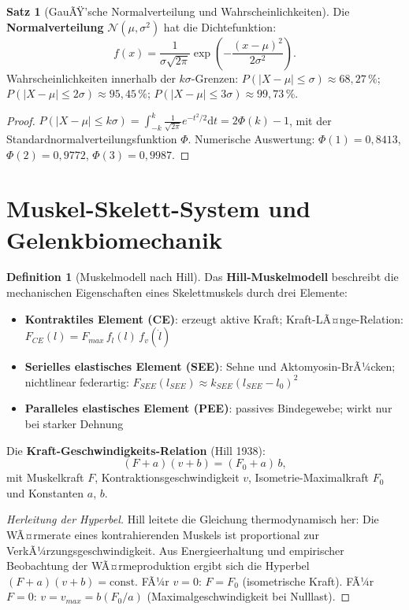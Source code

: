 ﻿\documentclass[a4paper,12pt]{report}
\theoremstyle{definition}
\newtheorem{definition}{Definition}
\newtheorem{satz}{Satz}
\begin{document}
\begin{satz}[GauÃŸ'sche Normalverteilung und Wahrscheinlichkeiten]
Die \textbf{Normalverteilung} $\mathcal{N}(\mu, \sigma^2)$ hat die Dichtefunktion:
\[
  f(x) = \frac{1}{\sigma\sqrt{2\pi}}\exp\left(-\frac{(x-\mu)^2}{2\sigma^2}\right).
\]
Wahrscheinlichkeiten innerhalb der $k\sigma$-Grenzen:
$P(|X-\mu| \le \sigma) \approx 68{,}27\,\%$;
$P(|X-\mu| \le 2\sigma) \approx 95{,}45\,\%$;
$P(|X-\mu| \le 3\sigma) \approx 99{,}73\,\%$.
\end{satz}
\begin{proof}
$P(|X-\mu| \le k\sigma) = \int_{-k}^k \frac{1}{\sqrt{2\pi}}e^{-t^2/2}\mathrm{d}t
= 2\Phi(k) - 1$, mit der Standardnormalverteilungsfunktion $\Phi$.
Numerische Auswertung: $\Phi(1) = 0{,}8413$, $\Phi(2) = 0{,}9772$, $\Phi(3) = 0{,}9987$.
\end{proof}


\section{Muskel-Skelett-System und Gelenkbiomechanik}

\begin{definition}[Muskelmodell nach Hill]
Das \textbf{Hill-Muskelmodell} beschreibt die mechanischen Eigenschaften
eines Skelettmuskels durch drei Elemente:
\begin{itemize}
    \item[-] \textbf{Kontraktiles Element (CE)}: erzeugt aktive Kraft;
          Kraft-LÃ¤nge-Relation: $F_{CE}(l) = F_{max}\,f_l(l)\,f_v(\dot{l})$
    \item[-] \textbf{Serielles elastisches Element (SEE)}: Sehne und Aktomyosin-BrÃ¼cken;
          nichtlinear federartig: $F_{SEE}(l_{SEE}) \approx k_{SEE}(l_{SEE}-l_0)^2$
    \item[-] \textbf{Paralleles elastisches Element (PEE)}: passives Bindegewebe;
          wirkt nur bei starker Dehnung
\end{itemize}
Die \textbf{Kraft-Geschwindigkeits-Relation} (Hill 1938):
\[
  (F + a)(v + b) = (F_0 + a)\,b,
\]
mit Muskelkraft $F$, Kontraktionsgeschwindigkeit $v$,
Isometrie-Maximalkraft $F_0$ und Konstanten $a$, $b$.
\end{definition}
\begin{proof}[Herleitung der Hyperbel]
Hill leitete die Gleichung thermodynamisch her:
Die WÃ¤rmerate eines kontrahierenden Muskels ist proportional zur VerkÃ¼rzungsgeschwindigkeit.
Aus Energieerhaltung und empirischer Beobachtung der WÃ¤rmeproduktion
ergibt sich die Hyperbel $(F+a)(v+b)=\mathrm{const}$.
FÃ¼r $v = 0$: $F = F_0$ (isometrische Kraft).
FÃ¼r $F = 0$: $v = v_{max} = b(F_0/a)$ (Maximalgeschwindigkeit bei Nulllast).
\end{proof}
\end{document}
